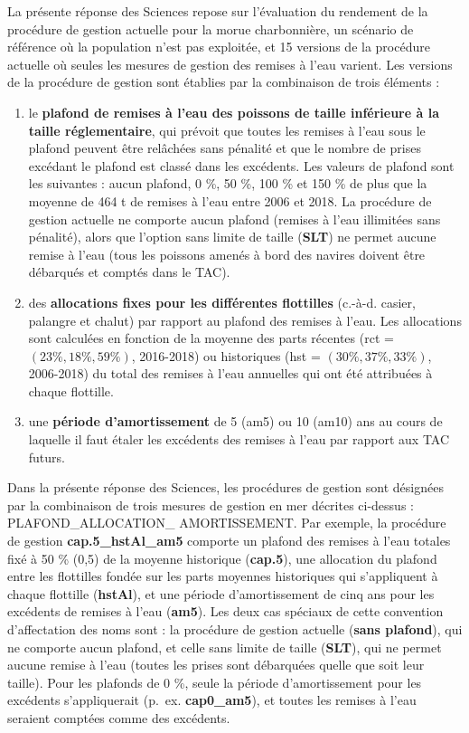 \documentclass[11pt]{book}
\begin{document}
La présente réponse des Sciences repose sur l'évaluation du rendement de la procédure de gestion actuelle pour la morue charbonnière, un scénario de référence où la population n'est pas exploitée, et 15 versions de la procédure actuelle où seules les mesures de gestion des remises à l'eau varient. Les versions de la procédure de gestion sont établies par la combinaison de trois éléments :
\begin{enumerate}
\def\labelenumi{\arabic{enumi}.}

\item
  le \textbf{plafond de remises à l'eau des poissons de taille inférieure à la taille réglementaire}, qui prévoit que toutes les remises à l'eau sous le plafond peuvent être relâchées sans pénalité et que le nombre de prises excédant le plafond est classé dans les excédents. Les valeurs de plafond sont les suivantes : aucun plafond, 0 \%, 50 \%, 100 \% et 150 \% de plus que la moyenne de 464 t de remises à l'eau entre 2006 et 2018. La procédure de gestion actuelle ne comporte aucun plafond (remises à l'eau illimitées sans pénalité), alors que l'option sans limite de taille (\textbf{SLT}) ne permet aucune remise à l'eau (tous les poissons amenés à bord des navires doivent être débarqués et comptés dans le TAC).
\item
  des \textbf{allocations fixes pour les différentes flottilles} (c.-à-d. casier, palangre et chalut) par rapport au plafond des remises à l'eau. Les allocations sont calculées en fonction de la moyenne des parts récentes (rct = \((23 \%, 18 \%, 59 \%)\), 2016-2018) ou historiques (hst = \((30 \%, 37 \%, 33 \%)\), 2006-2018) du total des remises à l'eau annuelles qui ont été attribuées à chaque flottille.
\item
  une \textbf{période d'amortissement } de 5 (am5) ou 10 (am10) ans au cours de laquelle il faut étaler les excédents des remises à l'eau par rapport aux TAC futurs.
\end{enumerate}
Dans la présente réponse des Sciences, les procédures de gestion sont désignées par la combinaison de trois mesures de gestion en mer décrites ci-dessus : PLAFOND\_ALLOCATION\_ AMORTISSEMENT. Par exemple, la procédure de gestion \textbf{cap.5\_hstAl\_am5} comporte un plafond des remises à l'eau totales fixé à 50 \% (0,5) de la moyenne historique (\textbf{cap.5}), une allocation du plafond entre les flottilles fondée sur les parts moyennes historiques qui s'appliquent à chaque flottille (\textbf{hstAl}), et une période d'amortissement de cinq ans pour les excédents de remises à l'eau (\textbf{am5}). Les deux cas spéciaux de cette convention d'affectation des noms sont : la procédure de gestion actuelle (\textbf{sans plafond}), qui ne comporte aucun plafond, et celle sans limite de taille (\textbf{SLT}), qui ne permet aucune remise à l'eau (toutes les prises sont débarquées quelle que soit leur taille). Pour les plafonds de 0 \%, seule la période d'amortissement pour les excédents s'appliquerait (p.~ex. \textbf{cap0\_am5}), et toutes les remises à l'eau seraient comptées comme des excédents.
\end{document}
